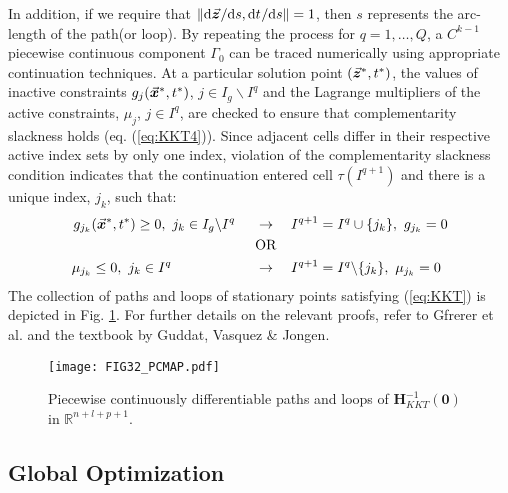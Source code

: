 In addition, if we require that
$\Vert \text{d}\vec{\bm{z}}^{}/\text{d}s,\text{d}t^{}/\text{d}s\Vert=1$, then $s$ 
represents the arc-length of the path(or loop). By repeating the process for 
$q=1,\dots,Q$, a $C^{k-1}$ piecewise continuous 
component $\mathit{\Gamma_0}$ can be traced numerically using appropriate 
continuation 
techniques. At a particular solution point $(\vec{\bm{z}}^*,t^*)$, 
the values of inactive constraints $g_j(\vec{\bm{x}}^*,t^*)$, $ j\in I_g\backslash 
I^q$ and the Lagrange
multipliers of the active constraints, $\mu_j$, $j\in I^q$,
are checked to ensure that complementarity slackness holds (eq.
(\ref{eq:KKT4})). Since adjacent cells differ in their respective active index
sets by only one index, violation of the complementarity slackness condition
indicates that the continuation entered cell $\tau(I^{q+1})$ and there is a
unique index, $j_k$, such that:
\begin{align*}
	g_{j_k}(\vec{\bm{x}}^*,t^*)\geq 0,\ j_k\in I_g\backslash I^q\hspace*{0.5cm} 
	&\rightarrow\quad
	I^{q+1}=I^q\cup\{j_k\},\ g_{j_k}=0\\
	&\text{OR}\\
	\mu_{j_k}\leq 0,\ j_k\in I^q \hspace*{2.1cm}&\rightarrow\quad 
	I^{q+1}=I^q\backslash\{j_k\},\
	\mu_{j_k}=0\\
\end{align*}
The collection of paths and loops of stationary points satisfying 
(\ref{eq:KKT}) is depicted in Fig. \ref{fig:FIG32}. For
further details on the relevant proofs, refer to
Gfrerer et al.\cite{Gfrerer:1985} and
the textbook by Guddat, Vasquez \& Jongen\cite{Guddat:1990}.
\begin{figure}[t]
	\centering
	\texttt{[image: FIG32\_PCMAP.pdf]}
	\caption{Piecewise continuously differentiable paths and loops of
		$\bm{H}_{KKT}^{-1}(\bm{0})$ in $\mathbb{R}^{n+l+p+1}$.}
	\label{fig:FIG32}
\end{figure}

\subsection{Global Optimization}\label{CH4-S1SS4}

